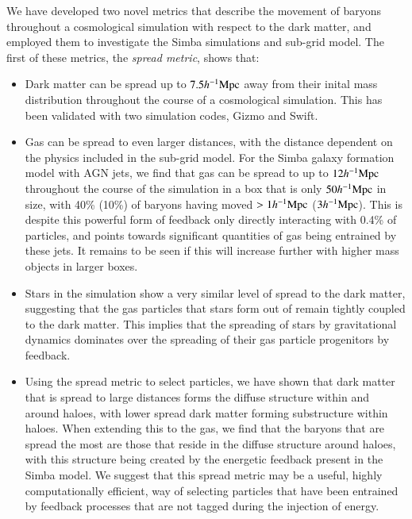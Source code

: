 \documentclass[fleqn,usenatbib]{mnras}
\newcommand{\hmpc}{h^{-1}{\rm Mpc}}
\newcommand{\gizmo}{{\sc Gizmo}}
\newcommand{\swift}{{\sc Swift}}
\newcommand{\simba}{{\sc Simba}}
\begin{document}
We have developed two novel metrics that describe the movement of baryons
throughout a cosmological simulation with respect to the dark matter, and
employed them to investigate the \simba{} simulations and sub-grid model.
The first of these metrics, the {\it spread metric}, shows that:
\begin{itemize}
    \item Dark matter can be spread up to $7.5\hmpc{}$ away from their inital
          mass distribution throughout the course of a cosmological simulation.
          This has been validated with two simulation codes, \gizmo{} and \swift{}.
    \item Gas can be spread to even larger distances, with the distance
          dependent on the physics included in the sub-grid model. For the
          \simba{} galaxy formation model with AGN jets, we find that gas can
          be spread to up to $12\hmpc{}$ throughout the course of the
          simulation in a box that is only $50\hmpc{}$ in size, with 40\%
          (10\%) of baryons having moved $> 1\hmpc{}$ ($3\hmpc{}$). This is
          despite this powerful form of feedback only directly interacting
          with 0.4\% of particles, and points towards significant quantities
          of gas being entrained by these jets. It remains to be seen if this
          will increase further with higher mass objects in larger boxes.
    \item Stars in the simulation show a very similar level of spread to the
          dark matter, suggesting that the gas particles that stars form out
          of remain tightly coupled to the dark matter. This implies that the
          spreading of stars by gravitational dynamics dominates over the
          spreading of their gas particle progenitors by feedback.
    \item Using the spread metric to select particles, we have shown that
          dark matter that is spread to large distances forms the diffuse
          structure within and around haloes, with lower spread dark matter
          forming substructure within haloes. When extending this to the gas,
          we find that the baryons that are spread the most are those that
          reside in the diffuse structure around haloes, with this structure
          being created by the energetic feedback present in the \simba{}
          model. We suggest that this spread metric may be a useful, highly
          computationally efficient, way of selecting particles that have been
          entrained by feedback processes that are not tagged during the
          injection of energy.
\end{itemize}
\end{document}
